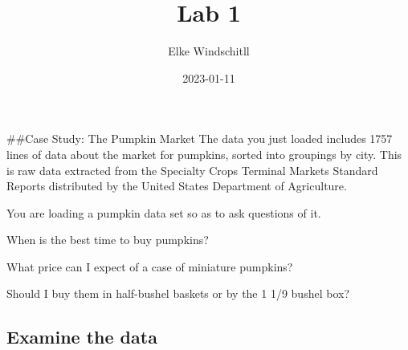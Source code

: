 \documentclass[
]{article}
\title{Lab 1}
\author{Elke Windschitll}
\date{2023-01-11}
\begin{document}
\maketitle

\#\#Case Study: The Pumpkin Market The data you just loaded includes
1757 lines of data about the market for pumpkins, sorted into groupings
by city. This is raw data extracted from the Specialty Crops Terminal
Markets Standard Reports distributed by the United States Department of
Agriculture.

You are loading a pumpkin data set so as to ask questions of it.

When is the best time to buy pumpkins?

What price can I expect of a case of miniature pumpkins?

Should I buy them in half-bushel baskets or by the 1 1/9 bushel box?

\hypertarget{examine-the-data}{%
\subsection{Examine the data}\label{examine-the-data}}
\end{document}
